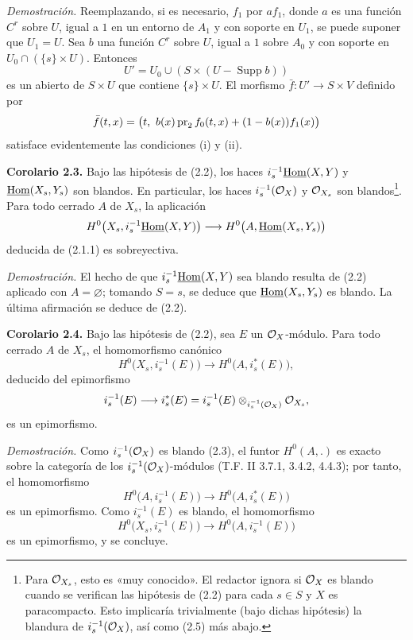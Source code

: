\providecommand{\sisi}[2]{#2}

\emph{Demostración.} Reemplazando, si es necesario, $f_1$ por $af_1$, donde $a$ es una función $C^r$ sobre $U$, igual a $1$ en un entorno de $A_1$ y con soporte en $U_1$, se puede suponer que $U_1=U$. Sea $b$ una función $C^r$ sobre $U$, igual a $1$ sobre $A_0$ y con soporte en $U_0\cap(\{s\}\times U)$. Entonces
\[
 U'=U_0\cup(S\times(U-\operatorname{Supp}b))
\]
es un abierto de $S\times U$ que contiene $\{s\}\times U$. El morfismo $\bar f:U'\to S\times V$ definido por
\[
 \bar f(t,x)=\bigl(t,\ b(x)\pr_2f_0(t,x)+(1-b(x))f_1(x)\bigr)
\]
satisface evidentemente las condiciones (i) y (ii).

\textbf{Corolario 2.3.} Bajo las hipótesis de (2.2), los haces $i_s^{-1}\underline{\operatorname{Hom}}(X,Y)$ y $\underline{\operatorname{Hom}}(X_s,Y_s)$ son blandos. En particular, los haces $i_s^{-1}(\mathcal O_X)$ y $\mathcal O_{X_s}$ son blandos\footnote{Para $\mathcal O_{X_s}$, esto es «muy conocido». El redactor ignora si $\mathcal O_X$ es blando cuando se verifican las hipótesis de (2.2) para cada $s\in S$ y $X$ es paracompacto. Esto implicaría trivialmente (bajo dichas hipótesis) la blandura de $i_s^{-1}(\mathcal O_X)$, así como (2.5) más abajo.}. Para todo cerrado $A$ de $X_s$, la aplicación
\[
 H^0\bigl(X_s,i_s^{-1}\underline{\operatorname{Hom}}(X,Y)\bigr)
 \longrightarrow
 H^0\bigl(A,\underline{\operatorname{Hom}}(X_s,Y_s)\bigr)
\]
deducida de (2.1.1) es sobreyectiva.

\emph{Demostración.} El hecho de que $i_s^{-1}\underline{\operatorname{Hom}}(X,Y)$ sea blando resulta de (2.2) aplicado con $A=\varnothing$; tomando $S=s$, se deduce que $\underline{\operatorname{Hom}}(X_s,Y_s)$ es blando. La última afirmación se deduce de (2.2).

\textbf{Corolario 2.4.} Bajo las hipótesis de (2.2), sea $E$ un $\mathcal O_X$-módulo. Para todo cerrado $A$ de $X_s$, el homomorfismo canónico
\[
 H^0\bigl(X_s,i_s^{-1}(E)\bigr)
 \longrightarrow
 H^0\bigl(A,i_s^*(E)\bigr),
\]
deducido del epimorfismo
\[
 i_s^{-1}(E)\longrightarrow i_s^*(E)
 =i_s^{-1}(E)\otimes_{i_s^{-1}(\mathcal O_X)}\mathcal O_{X_s},
\]
es un epimorfismo.

\emph{Demostración.} Como $i_s^{-1}(\mathcal O_X)$ es blando (2.3), el funtor $H^0(A,.)$ es exacto sobre la categoría de los $i_s^{-1}(\mathcal O_X)$-módulos (T.F. II 3.7.1, 3.4.2, 4.4.3); por tanto, el homomorfismo
\[
 H^0\bigl(A,i_s^{-1}(E)\bigr)
 \longrightarrow
 H^0\bigl(A,i_s^*(E)\bigr)
\]
es un epimorfismo. Como $i_s^{-1}(E)$ es blando, el homomorfismo
\[
 H^0\bigl(X_s,i_s^{-1}(E)\bigr)
 \longrightarrow
 H^0\bigl(A,i_s^{-1}(E)\bigr)
\]
es un epimorfismo, y se concluye.


